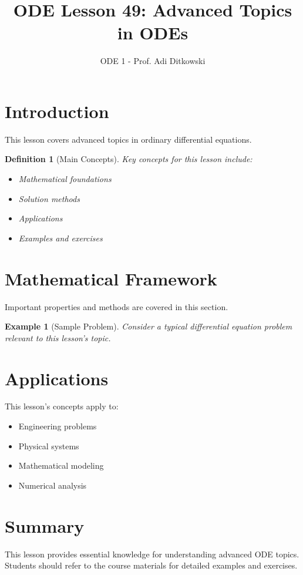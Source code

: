 \documentclass[12pt]{article}
\title{ODE Lesson 49: Advanced Topics in ODEs}
\author{ODE 1 - Prof. Adi Ditkowski}
\date{}
\newtheorem{definition}{Definition}
\newtheorem{example}{Example}
\begin{document}
\maketitle

\section{Introduction}

This lesson covers advanced topics in ordinary differential equations.

\begin{definition}[Main Concepts]
Key concepts for this lesson include:
\begin{itemize}
\item Mathematical foundations
\item Solution methods
\item Applications
\item Examples and exercises
\end{itemize}
\end{definition}

\section{Mathematical Framework}

\begin{keypoint}
Important properties and methods are covered in this section.
\end{keypoint}

\begin{example}[Sample Problem]
Consider a typical differential equation problem relevant to this lesson's topic.
\end{example}

\section{Applications}

This lesson's concepts apply to:
\begin{itemize}
\item Engineering problems
\item Physical systems
\item Mathematical modeling
\item Numerical analysis
\end{itemize}

\section{Summary}

This lesson provides essential knowledge for understanding advanced ODE topics.
Students should refer to the course materials for detailed examples and exercises.
\end{document}

